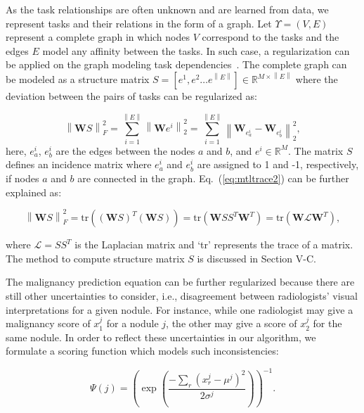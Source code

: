 \documentclass[journal]{IEEEtran}
\begin{document}
As the task relationships are often unknown and are learned from data, we represent tasks and their relations in the form of a graph. Let $\Upsilon=(V,E)$ represent a complete graph in which nodes $V$ correspond to the tasks and the edges $E$ model any affinity between the tasks. In such case, a regularization can be applied on the graph modeling task dependencies~\cite{zhou2011malsar}. The complete graph can be modeled as a structure matrix $S=[e^1,e^2 \dots e^{\left \| E \right \|}]\in\mathbb{R}^{M\times\left \| E \right \|}$ where the deviation between the pairs of tasks can be regularized as:

\begin{equation}
\left \|\mathbf{W}S  \right \|_{F}^{2}=\sum_{i=1}^{\left \| E \right \|} \left \|\mathbf{W}e^i \right \|_{2}^{2}=
\sum_{i=1}^{\left \| E \right \|} \left \|\mathbf{W}_{e^{i}_{a}}-\mathbf{W}_{e^{i}_{b}} \right \|_{2}^{2},
\label{eq:mtltrace2}
\end{equation}
\noindent here, $e^{i}_{a}$, $e^{i}_{b}$ are the edges between the nodes $a$ and $b$, and $e^{i}\in\mathbb{R}^{M}$. The matrix $S$ defines an incidence matrix where $e^{i}_{a}$ and $e^{i}_{b}$ are assigned to 1 and -1, respectively, if nodes $a$ and $b$ are connected in the graph. Eq.~(\ref{eq:mtltrace2}) can be further explained as:

\begin{equation}
\left \|\mathbf{W}S  \right \|_{F}^{2}=\text{tr}((\mathbf{W}S)^T (\mathbf{W}S))=\text{tr}(\mathbf{W}SS^T \mathbf{W}^T)=\text{tr}(\mathbf{W} \mathcal{L}\mathbf{W}^T),
\label{eq:mtltrace}
\end{equation}

\noindent where $\mathcal{L}=SS^T$ is the Laplacian matrix and `tr' represents the trace of a matrix. The method to compute structure matrix $S$ is discussed in Section V-C.

The malignancy prediction equation can be further regularized because there are still other uncertainties to consider, i.e., disagreement between radiologists' visual interpretations for a given nodule. For instance, while one radiologist may give a malignancy score of $x_1^j$ for a nodule $j$, the other may give a score of $x_2^j$ for the same nodule. In order to reflect these uncertainties in our algorithm, we formulate a scoring function which models such inconsistencies:

\begin{equation}
\Psi(j) =\left (\exp(\frac{-\sum_{r}(x_r^j-\mu^j )^{2}}{2\sigma^j} )\right )^{-1}.
\end{equation}
\end{document}
